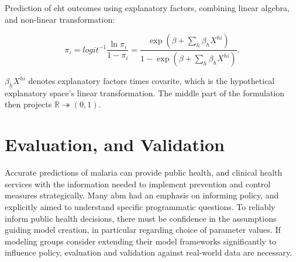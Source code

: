 \documentclass[a4paper, 12pt, twoside]{article}
\begin{document}
Prediction of \gls{eht} outcomes using explanatory factors, combining linear algebra, and non-linear transformation\cite{Sherrard-Smith2018b}:

\[
	\pi_i = logit^{-1} \frac{\ln \pi_i}{1-\pi_i} = \frac{ \exp( \beta + \sum_h \beta_h X^{hi} ) }{ 1 - \exp( \beta + \sum_h \beta_h X^{hi} ) }
	.\]

$\beta_h X^{hi}$ denotes explanatory factors times covarite, which is the hypothetical explanatory space's linear transformation.
The middle part of the formulation then projects $\mathbb{R} \twoheadrightarrow (0,1)$.

\section{Evaluation, and Validation}
Accurate predictions of malaria can provide public health, and clinical health services with the information needed to implement prevention and control measures strategically.
Many \gls{abm} had an emphasis on informing policy, and explicitly aimed to understand specific programmatic questions.
To reliably inform public health decisions, there must be confidence in the assumptions guiding model creation, in particular regarding choice of parameter values.
If modeling groups consider extending their model frameworks significantly to influence policy, evaluation and validation against real-world data are necessary.
\end{document}
